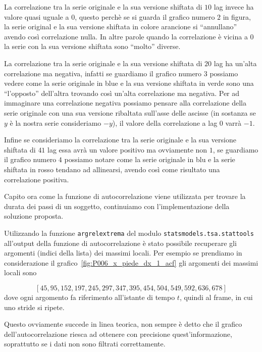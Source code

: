 La correlazione tra la serie originale e la sua versione shiftata di $10$ lag invece ha valore
quasi uguale a $0$, questo perchè se si guarda il grafico numero $2$ in figura, la serie 
original e la sua versione shiftata in colore arancione si ``annullano'' avendo così correlazione
nulla. In altre parole quando la correlazione è vicina a $0$ la serie con la sua versione shiftata
sono ``molto'' diverse.

La correlazione tra la serie originale e la sua versione shiftata di $20$ lag ha un'alta correlazione
ma negativa, infatti se guardiamo il grafico numero $3$ possiamo vedere come la serie originale in blue
e la sua versione shiftata in verde sono una ``l'opposto'' dell'altra trovando così un'alta correlazione
ma negativa. Per ad immaginare una correlazione negativa possiamo pensare alla correlazione della serie
originale con una sua versione ribaltata sull'asse delle ascisse (in sostanza se $y$ è la nostra serie consideriamo $-y$),
il valore della correlazione a lag $0$ varrà $-1$.

Infine se consideriamo la correlazione tra la serie originale e la sua versione shiftata di $41$ lag
essa avrà un valore positivo ma ovviamente non $1$, se guardiamo il grafico numero $4$ possiamo notare
come la serie originale in blu e la serie shiftata in rosso tendano ad allinearsi, avendo così
come risultato una correlazione positiva.

Capito ora come la funzione di autocorrelazione viene utilizzata per trovare la durata
dei passi di un soggetto, continuiamo con l'implementazione della soluzione proposta.

\begin{sloppypar}
Utilizzando la funzione \texttt{argrelextrema} del modulo \texttt{statsmodels.tsa.stattools}
all'output della funzione di autocorrelazione è stato possibile recuperare gli argomenti (indici della lista) dei massimi locali.
Per esempio se prendiamo in considerazione il grafico~\ref{fig:P006_x_piede_dx_1_acf} gli argomenti
dei massimi locali sono
\end{sloppypar}
\[ [45, 95, 152, 197, 245, 297, 347, 395, 454, 504, 549, 592, 636, 678] \]
dove ogni argomento fa riferimento all'istante di tempo $t$, quindi al frame, in cui uno stride si ripete.

\begin{sloppypar}
Questo ovviamente succede in linea teorica, non sempre è detto che il grafico dell'autocorrelazione
riesca ad ottenere con precisione quest'informazione, soprattutto se i dati non sono filtrati correttamente.
\end{sloppypar}


